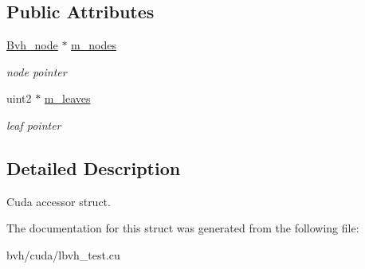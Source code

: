 \subsection*{\-Public \-Attributes}
\begin{DoxyCompactItemize}
\item 
\hypertarget{structnih_1_1_l_b_v_h__context_1_1_context_af88ebefc426d8091a059912ffe67178f}{
\hyperlink{structnih_1_1_bvh__node}{\-Bvh\-\_\-node} $\ast$ \hyperlink{structnih_1_1_l_b_v_h__context_1_1_context_af88ebefc426d8091a059912ffe67178f}{m\-\_\-nodes}}
\label{structnih_1_1_l_b_v_h__context_1_1_context_af88ebefc426d8091a059912ffe67178f}

\begin{DoxyCompactList}\small\item\em node pointer \end{DoxyCompactList}\item 
\hypertarget{structnih_1_1_l_b_v_h__context_1_1_context_ae97acea5ec92da5d4a547bc8416fef5e}{
uint2 $\ast$ \hyperlink{structnih_1_1_l_b_v_h__context_1_1_context_ae97acea5ec92da5d4a547bc8416fef5e}{m\-\_\-leaves}}
\label{structnih_1_1_l_b_v_h__context_1_1_context_ae97acea5ec92da5d4a547bc8416fef5e}

\begin{DoxyCompactList}\small\item\em leaf pointer \end{DoxyCompactList}\end{DoxyCompactItemize}


\subsection{\-Detailed \-Description}
\-Cuda accessor struct. 

\-The documentation for this struct was generated from the following file\-:\begin{DoxyCompactItemize}
\item 
bvh/cuda/lbvh\-\_\-test.\-cu\end{DoxyCompactItemize}
